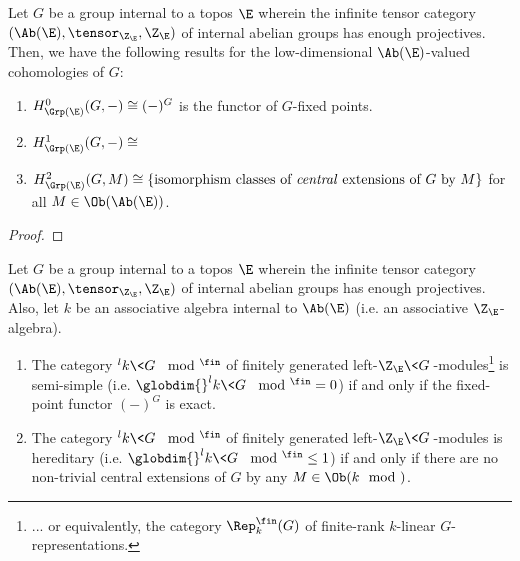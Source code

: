             \begin{remark}
                
            \end{remark}
            \begin{proposition} \label{prop: low_dimensional_group_cohomologies}
                Let $G$ be a group internal to a topos $\E$ wherein the infinite tensor category $(\Ab(\E), \tensor_{\Z_{\E}}, \Z_{\E})$ of internal abelian groups has enough projectives. Then, we have the following results for the low-dimensional $\Ab(\E)$-valued cohomologies of $G$:
                    \begin{enumerate}
                        \item $H^0_{\Grp(\E)}(G, -) \cong (-)^G$ is the functor of $G$-fixed points.
                        \item $H^1_{\Grp(\E)}(G, -) \cong $
                        \item $H^2_{\Grp(\E)}(G, M) \cong \{ \text{isomorphism classes of \textit{central} extensions of $G$ by $M$} \}$ for all $M \in \Ob(\Ab(\E))$.
                    \end{enumerate}
            \end{proposition}
                \begin{proof}
                    
                \end{proof}
            \begin{corollary} \label{coro: criteria_for_being_semi_simeple_and_hereditary}
                Let $G$ be a group internal to a topos $\E$ wherein the infinite tensor category $(\Ab(\E), \tensor_{\Z_{\E}}, \Z_{\E})$ of internal abelian groups has enough projectives. Also, let $k$ be an associative algebra internal to $\Ab(\E)$ (i.e. an associative $\Z_{\E}$-algebra).
                    \begin{enumerate}
                        \item The category ${}^lk\<G\>\mod^{\fin}$ of finitely generated left-$\Z_{\E}\<G\>$-modules\footnote{... or equivalently, the category $\Rep_k^{\fin}(G)$ of finite-rank $k$-linear $G$-representations.} is semi-simple (i.e. $\globdim {}^lk\<G\>\mod^{\fin} = 0$) if and only if the fixed-point functor $(-)^G$ is exact.
                        \item The category ${}^lk\<G\>\mod^{\fin}$ of finitely generated left-$\Z_{\E}\<G\>$-modules is hereditary (i.e. $\globdim {}^lk\<G\>\mod^{\fin} \leq 1$) if and only if there are no non-trivial central extensions of $G$ by any $M \in \Ob(k\mod)$.
                    \end{enumerate}
            \end{corollary}
